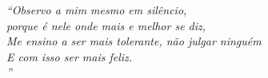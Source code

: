 \begin{epigrafe}
    \vspace*{\fill}
	\begin{flushright}
		\textit{``Observo a mim mesmo em silêncio, \\
		porque é nele onde mais e melhor se diz, \\
		Me  ensino a ser mais tolerante, não julgar ninguém \\
		E com isso ser mais feliz.\\
		''}
	\end{flushright}
\end{epigrafe}
